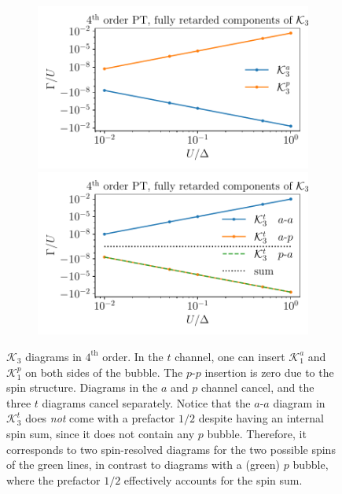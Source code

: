 \documentclass[10pt]{scrartcl}
\newcommand{\Ktot}[1]{\mathcal{K}_#1}
\newcommand{\K}[2]{\mathcal{K}_#1^#2}
\begin{document}
\begin{figure}[h!]
\begin{subfigure}[c]{0.4\textwidth}
\end{subfigure}
\begin{subfigure}[c]{0.4\textwidth}
\includegraphics[scale=0.65]{plots/PT4_K3ap}
\includegraphics[scale=0.65]{plots/PT4_K3t}
\end{subfigure}
\caption{$\Ktot3$ diagrams in $4^\text{th}$ order. In the $t$ channel, one can insert $\K1a$ and $\K1p$ on both sides of the bubble. The $p$-$p$ insertion is zero due to the spin structure. Diagrams in the $a$ and $p$ channel cancel, and the three $t$ diagrams cancel separately. Notice that the $a$-$a$ diagram in $\K3t$ does \textit{not} come with a prefactor $1/2$ despite having an internal spin sum, since it does not contain any $p$ bubble. Therefore, it corresponds to two spin-resolved diagrams for the two possible spins of the green lines, in contrast to diagrams with a (green) $p$ bubble, where the prefactor $1/2$ effectively accounts for the spin sum.}
\end{figure}
\end{document}
